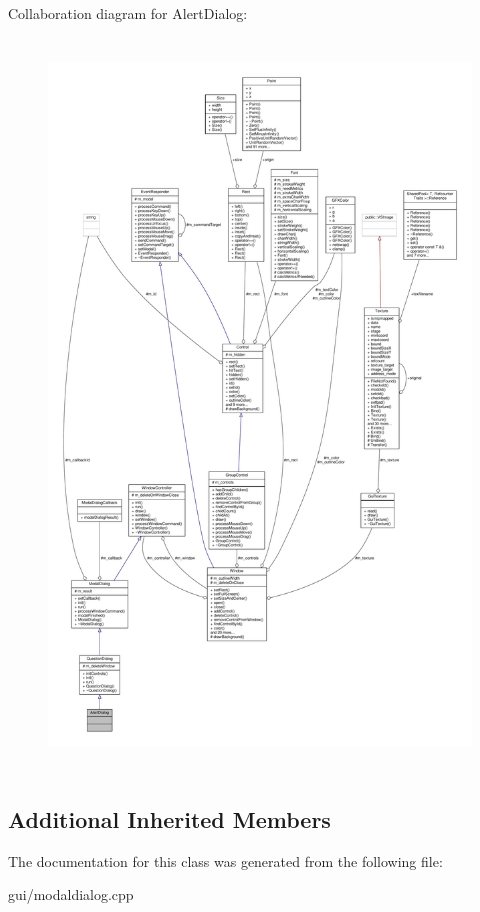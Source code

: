 Collaboration diagram for Alert\+Dialog\+:
\nopagebreak
\begin{figure}[H]
\begin{center}
\leavevmode
\includegraphics[height=550pt]{d2/d03/classAlertDialog__coll__graph}
\end{center}
\end{figure}
\subsection*{Additional Inherited Members}


The documentation for this class was generated from the following file\+:\begin{DoxyCompactItemize}
\item 
gui/modaldialog.\+cpp\end{DoxyCompactItemize}
